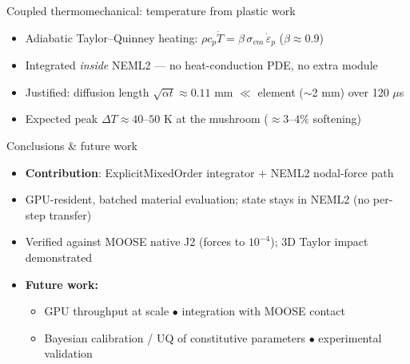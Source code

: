 \documentclass[aspectratio=169,11pt]{beamer}
\begin{document}
\begin{frame}{Coupled thermomechanical: temperature from plastic work}
\begin{itemize}
  \item Adiabatic Taylor--Quinney heating: $\rho c_p \dot{T} = \beta\,\sigma_{vm}\,\dot{\varepsilon}_p$ \;($\beta\approx0.9$)
  \item Integrated \emph{inside} NEML2 --- no heat-conduction PDE, no extra module
  \item Justified: diffusion length $\sqrt{\alpha t}\approx 0.11$ mm $\ll$ element ($\sim$2 mm) over 120 $\mu$s
  \item Expected peak $\Delta T \approx 40$--$50$ K at the mushroom ($\approx 3$--$4\%$ softening)
\end{itemize}
\vspace{0.5em}
\begin{center}
\end{center}
\end{frame}

\begin{frame}{Conclusions \& future work}
\begin{itemize}
  \item \textcolor{nblue}{\textbf{Contribution}}: ExplicitMixedOrder integrator $+$ NEML2 nodal-force path
  \item GPU-resident, batched material evaluation; state stays in NEML2 (no per-step transfer)
  \item Verified against MOOSE native J2 (forces to $10^{-4}$); 3D Taylor impact demonstrated
  \item \textcolor{ngreen}{\textbf{Future work:}}
  \begin{itemize}
    \item GPU throughput at scale \quad $\bullet$ integration with MOOSE contact
    \item Bayesian calibration / UQ of constitutive parameters \quad $\bullet$ experimental validation
  \end{itemize}
\end{itemize}
\end{frame}
\end{document}
